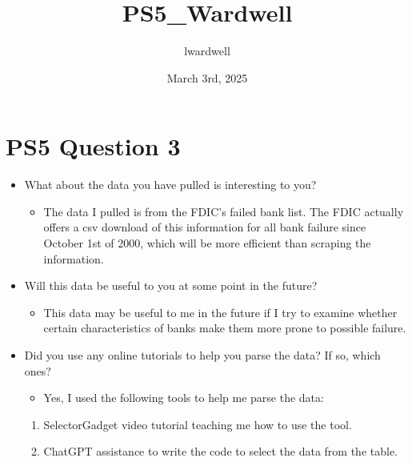 \documentclass{article}
\title{PS5\_Wardwell}
\author{lwardwell }
\date{March 3rd, 2025}
\begin{document}
\maketitle

\section*{PS5 Question 3}
\begin{itemize}[label=\bullet] 
    \item What about the data you have pulled is interesting to you?
    \begin{itemize}[label=\diamond]
        \item The data I pulled is from the FDIC's failed bank list. The FDIC actually offers a csv download of this information for all bank failure since October 1st of 2000, which will be more efficient than scraping the information.         
    \end{itemize}
    \item Will this data be useful to you at some point in the future?
    \begin{itemize}[label=\diamond]
        \item This data may be useful to me in the future if I try to examine whether certain characteristics of banks make them more prone to possible failure.
    \end{itemize}
    \item Did you use any online tutorials to help you parse the data? If so, which ones?
    \begin{itemize}[label=\diamond]
        \item Yes, I used the following tools to help me parse the data:
    \end{itemize}
            \begin{enumerate}
            \item SelectorGadget video tutorial teaching me how to use the tool.
            \item ChatGPT assistance to write the code to select the data from the table.
    \end{enumerate}
    \end{itemize}
\end{document}
